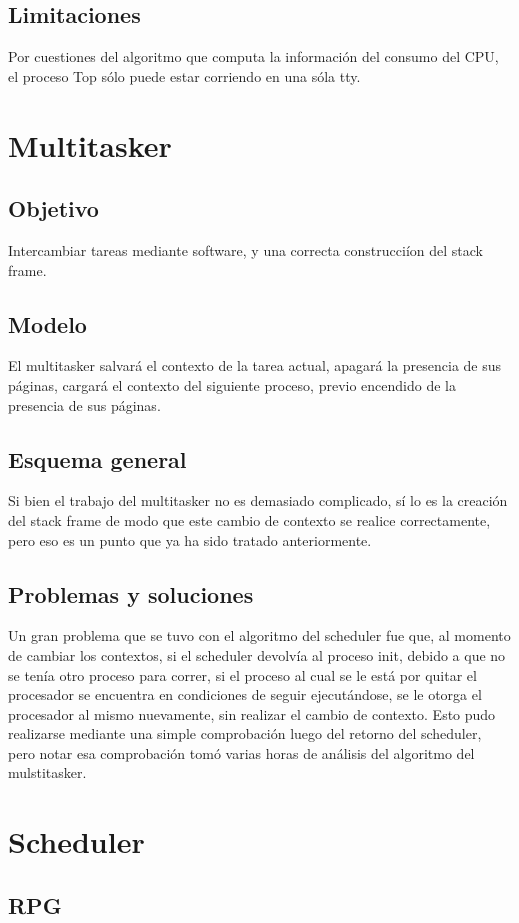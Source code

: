 \documentclass[10pt,a4paper]{article}
\begin{document}
	\subsection{Limitaciones}
		Por cuestiones del algoritmo que computa la informaci\'on del consumo del CPU, el proceso Top s\'olo puede estar corriendo en una s\'ola tty.
\newpage
\section{Multitasker}
	\subsection{Objetivo}
	Intercambiar tareas mediante software, y una correcta construcci\'ion del stack frame.
	\subsection{Modelo}
		El multitasker salvar\'a el contexto de la tarea actual, apagar\'a la presencia de sus p\'aginas, cargar\'a el contexto del siguiente proceso, previo encendido de la presencia de sus p\'aginas.
	\subsection{Esquema general}
		Si bien el trabajo del multitasker no es demasiado complicado, s\'i lo es la creaci\'on del stack frame de modo que este cambio de contexto se realice correctamente, pero eso es un punto que ya ha sido tratado anteriormente.
	\subsection{Problemas y soluciones}
		Un gran problema que se tuvo con el algoritmo del scheduler fue que, al momento de cambiar los contextos, si el scheduler devolv\'ia al proceso init, debido a que no se ten\'ia otro proceso para correr, si el proceso al cual se le est\'a por quitar el procesador se encuentra en condiciones de seguir ejecut\'andose, se le otorga el procesador al mismo nuevamente, sin realizar el cambio de contexto. Esto pudo realizarse mediante una simple comprobaci\'on luego del retorno del scheduler, pero notar esa comprobaci\'on tom\'o varias horas de an\'alisis del algoritmo del mulstitasker.
\newpage
\section{Scheduler}
	\subsection{RPG}
\end{document}
